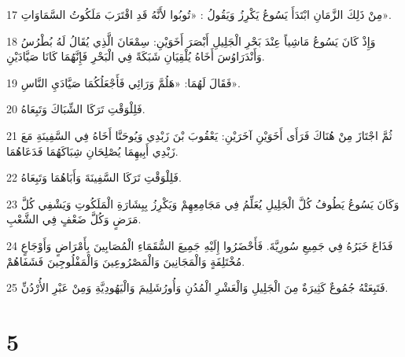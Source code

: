 \par 17 مِنْ ذَلِكَ الزَّمَانِ ابْتَدَأَ يَسُوعُ يَكْرِزُ وَيَقُولُ : «تُوبُوا لأَنَّهُ قَدِ اقْتَرَبَ مَلَكُوتُ السَّمَاوَاتِ».
\par 18 وَإِذْ كَانَ يَسُوعُ مَاشِياً عِنْدَ بَحْرِ الْجَلِيلِ أَبْصَرَ أَخَوَيْنِ: سِمْعَانَ الَّذِي يُقَالُ لَهُ بُطْرُسُ وَأَنْدَرَاوُسَ أَخَاهُ يُلْقِيَانِ شَبَكَةً فِي الْبَحْرِ فَإِنَّهُمَا كَانَا صَيَّادَيْنِ.
\par 19 فَقَالَ لَهُمَا: «هَلُمَّ وَرَائِي فَأَجْعَلُكُمَا صَيَّادَيِ النَّاسِ».
\par 20 فَلِلْوَقْتِ تَرَكَا الشِّبَاكَ وَتَبِعَاهُ.
\par 21 ثُمَّ اجْتَازَ مِنْ هُنَاكَ فَرَأَى أَخَوَيْنِ آخَرَيْنِ: يَعْقُوبَ بْنَ زَبْدِي وَيُوحَنَّا أَخَاهُ فِي السَّفِينَةِ مَعَ زَبْدِي أَبِيهِمَا يُصْلِحَانِ شِبَاكَهُمَا فَدَعَاهُمَا.
\par 22 فَلِلْوَقْتِ تَرَكَا السَّفِينَةَ وَأَبَاهُمَا وَتَبِعَاهُ.
\par 23 وَكَانَ يَسُوعُ يَطُوفُ كُلَّ الْجَلِيلِ يُعَلِّمُ فِي مَجَامِعِهِمْ وَيَكْرِزُ بِبِشَارَةِ الْمَلَكُوتِ وَيَشْفِي كُلَّ مَرَضٍ وَكُلَّ ضَعْفٍ فِي الشَّعْبِ.
\par 24 فَذَاعَ خَبَرُهُ فِي جَمِيعِ سُورِيَّةَ. فَأَحْضَرُوا إِلَيْهِ جَمِيعَ السُّقَمَاءِ الْمُصَابِينَ بِأَمْرَاضٍ وَأَوْجَاعٍ مُخْتَلِفَةٍ وَالْمَجَانِينَ وَالْمَصْرُوعِينَ وَالْمَفْلُوجِينَ فَشَفَاهُمْ.
\par 25 فَتَبِعَتْهُ جُمُوعٌ كَثِيرَةٌ مِنَ الْجَلِيلِ وَالْعَشْرِ الْمُدُنِ وَأُورُشَلِيمَ وَالْيَهُودِيَّةِ وَمِنْ عَبْرِ الأُرْدُنِّ.

\chapter{5}

